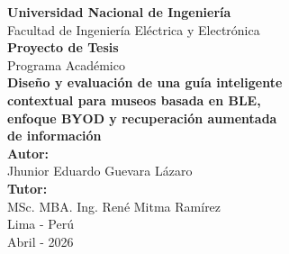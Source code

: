\begin{titlepage}
    \centering

    {\Large \textbf{Universidad Nacional de Ingeniería}}\\[0.3cm]
    {\large Facultad de Ingeniería Eléctrica y Electrónica}\\[1.8cm]


    {\Large \textbf{Proyecto de Tesis}}\\[0.2cm]
    {\large Programa Académico}\\[1.5cm]

    {\Large \textbf{Diseño y evaluación de una guía inteligente}}\\
    {\Large \textbf{contextual para museos basada en BLE,}}\\
    {\Large \textbf{enfoque BYOD y recuperación aumentada}}\\
    {\Large \textbf{de información}}\\[1.5cm]

    {\large \textbf{Autor:}}\\[0.2cm]
    {\large Jhunior Eduardo Guevara Lázaro}\\[1cm]

    {\large \textbf{Tutor:}}\\[0.2cm]
    {\large MSc. MBA. Ing. René Mitma Ramírez}\\[1.5cm]

    {\large Lima - Perú}\\
    {\large Abril - 2026}

\end{titlepage}
